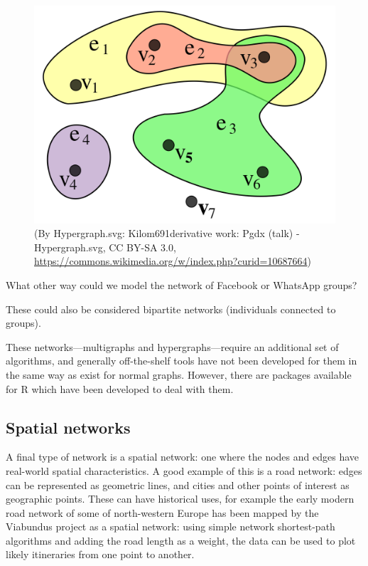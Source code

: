 \documentclass[
]{book}
\begin{document}
\begin{figure}
\centering
\includegraphics[width=5.20833in,height=\textheight]{images/1920px-Hypergraph-wikipedia.svg.png}
\caption{(By Hypergraph.svg: Kilom691derivative work: Pgdx (talk) - Hypergraph.svg, CC BY-SA 3.0, \url{https://commons.wikimedia.org/w/index.php?curid=10687664})}
\end{figure}

What other way could we model the network of Facebook or WhatsApp groups?

These could also be considered bipartite networks (individuals connected to groups).

These networks---multigraphs and hypergraphs---require an additional set of algorithms, and generally off-the-shelf tools have not been developed for them in the same way as exist for normal graphs. However, there are packages available for R which have been developed to deal with them.

\hypertarget{spatial-networks}{%
\subsection{Spatial networks}\label{spatial-networks}}

A final type of network is a spatial network: one where the nodes and edges have real-world spatial characteristics. A good example of this is a road network: edges can be represented as geometric lines, and cities and other points of interest as geographic points. These can have historical uses, for example the early modern road network of some of north-western Europe has been mapped by the Viabundus project as a spatial network: using simple network shortest-path algorithms and adding the road length as a weight, the data can be used to plot likely itineraries from one point to another.
\end{document}
